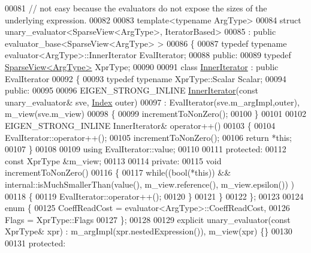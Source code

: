 \begin{DoxyCode}
00081 \textcolor{comment}{// not easy because the evaluators do not expose the sizes of the underlying expression.}
00082   
00083 \textcolor{keyword}{template}<\textcolor{keyword}{typename} ArgType>
00084 \textcolor{keyword}{struct }unary\_evaluator<SparseView<ArgType>, IteratorBased>
00085   : \textcolor{keyword}{public} evaluator\_base<SparseView<ArgType> >
00086 \{
00087     \textcolor{keyword}{typedef} \textcolor{keyword}{typename} evaluator<ArgType>::InnerIterator EvalIterator;
00088   \textcolor{keyword}{public}:
00089     \textcolor{keyword}{typedef} \hyperlink{group___sparse_core___module_class_eigen_1_1_sparse_view}{SparseView<ArgType>} XprType;
00090     
00091     \textcolor{keyword}{class }\hyperlink{class_eigen_1_1_inner_iterator}{InnerIterator} : \textcolor{keyword}{public} EvalIterator
00092     \{
00093         \textcolor{keyword}{typedef} \textcolor{keyword}{typename} XprType::Scalar Scalar;
00094       \textcolor{keyword}{public}:
00095 
00096         EIGEN\_STRONG\_INLINE \hyperlink{class_eigen_1_1_inner_iterator}{InnerIterator}(\textcolor{keyword}{const} unary\_evaluator& sve, 
      \hyperlink{group___core___module_a554f30542cc2316add4b1ea0a492ff02}{Index} outer)
00097           : EvalIterator(sve.m\_argImpl,outer), m\_view(sve.m\_view)
00098         \{
00099           incrementToNonZero();
00100         \}
00101 
00102         EIGEN\_STRONG\_INLINE InnerIterator& operator++()
00103         \{
00104           EvalIterator::operator++();
00105           incrementToNonZero();
00106           \textcolor{keywordflow}{return} *\textcolor{keyword}{this};
00107         \}
00108 
00109         \textcolor{keyword}{using} EvalIterator::value;
00110 
00111       \textcolor{keyword}{protected}:
00112         \textcolor{keyword}{const} XprType &m\_view;
00113 
00114       \textcolor{keyword}{private}:
00115         \textcolor{keywordtype}{void} incrementToNonZero()
00116         \{
00117           \textcolor{keywordflow}{while}((\textcolor{keywordtype}{bool}(*\textcolor{keyword}{this})) && internal::isMuchSmallerThan(value(), m\_view.reference(), m\_view.epsilon())
      )
00118           \{
00119             EvalIterator::operator++();
00120           \}
00121         \}
00122     \};
00123     
00124     \textcolor{keyword}{enum} \{
00125       CoeffReadCost = evaluator<ArgType>::CoeffReadCost,
00126       Flags = XprType::Flags
00127     \};
00128     
00129     \textcolor{keyword}{explicit} unary\_evaluator(\textcolor{keyword}{const} XprType& xpr) : m\_argImpl(xpr.nestedExpression()), m\_view(xpr) \{\}
00130 
00131   \textcolor{keyword}{protected}:

\end{DoxyCode}

